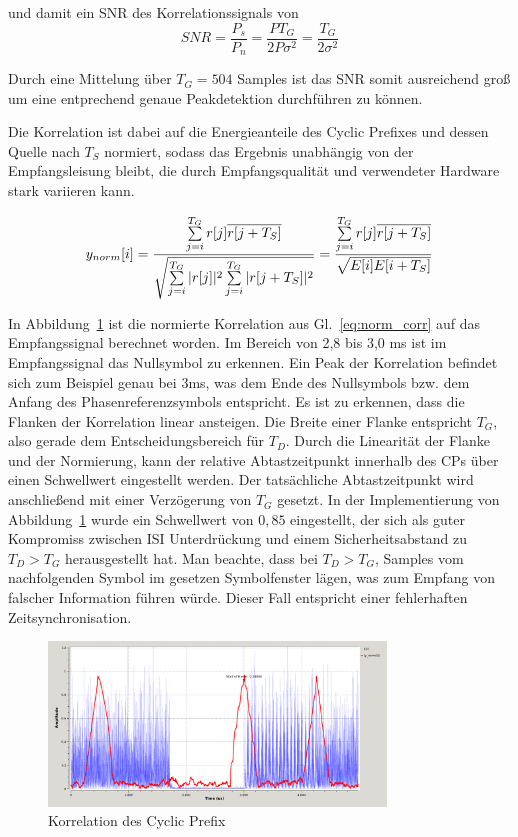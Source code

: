 und damit ein SNR des Korrelationssignals von
\begin{equation}
SNR = \frac{P_s}{P_n} = \frac{P T_G}{2 P \sigma^2} = \frac{T_G}{2 \sigma^2}
\end{equation}

Durch eine Mittelung über $T_G = 504$ Samples ist das SNR somit ausreichend groß um eine entprechend genaue Peakdetektion durchführen zu können.

Die Korrelation ist dabei auf die Energieanteile des Cyclic Prefixes und dessen Quelle nach $T_S$ normiert, sodass das Ergebnis unabhängig von der Empfangsleisung bleibt, die durch Empfangsqualität und verwendeter Hardware stark variieren kann.

\begin{equation}
    y_{norm}[i] = \frac{\sum \limits_{j=i}^{T_G}r[j] \overline{r[j+T_S]}}{\sqrt{\sum \limits_{j=i}^{T_G}|r[j]|^2 \sum \limits_{j=i}^{T_G}|r[j+T_S]|^2}} = \frac{\sum \limits_{j=i}^{T_G}r[j]     \overline{r[j+T_S]}}{\sqrt{E[i]E[i+T_S]}}
    \label{eq:norm_corr}
\end{equation}

In Abbildung~\ref{fig:corr} ist die normierte Korrelation aus Gl.~\ref{eq:norm_corr} auf das Empfangssignal berechnet worden. Im Bereich von 2,8 bis 3,0 ms ist im Empfangssignal das Nullsymbol zu erkennen. Ein Peak der Korrelation befindet sich zum Beispiel genau bei 3ms, was dem Ende des Nullsymbols bzw. dem Anfang des Phasenreferenzsymbols entspricht. Es ist zu erkennen, dass die Flanken der Korrelation linear ansteigen. Die Breite einer Flanke entspricht $T_G$, also gerade dem Entscheidungsbereich für $T_D$. Durch die Linearität der Flanke und der Normierung, kann der relative Abtastzeitpunkt innerhalb des CPs über einen Schwellwert eingestellt werden. Der tatsächliche Abtastzeitpunkt wird anschließend mit einer Verzögerung von $T_G$ gesetzt. In der Implementierung von Abbildung~\ref{fig:corr} wurde ein Schwellwert von $0,85$ eingestellt, der sich als guter Kompromiss zwischen \ac{ISI} Unterdrückung und einem Sicherheitsabstand zu $T_D > T_G$ herausgestellt hat. Man beachte, dass bei $T_D > T_G$, Samples vom nachfolgenden Symbol im gesetzen Symbolfenster lägen, was zum Empfang von falscher Information führen würde. Dieser Fall entspricht einer fehlerhaften Zeitsynchronisation.

\begin{figure}[h]
\centering
  \includegraphics[width=0.8\textwidth]{figures/delayed_correlation_abs_and_energy.png}
	\caption{Korrelation des Cyclic Prefix}
	\label{fig:corr}
\end{figure}


